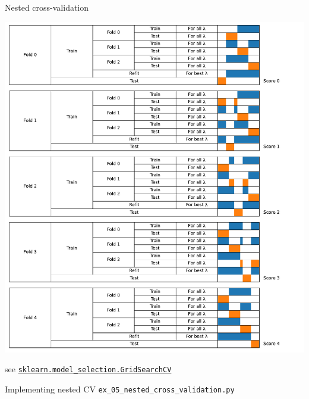 \documentclass[presentation,mathserif,table]{beamer}
\begin{document}
\begin{frame}[label={sec:org11d1bcf},fragile]{Nested cross-validation}
 \begin{center}
\includegraphics[width=.9\linewidth]{cv_figure_nested.pdf}
\end{center}
see  \href{https://scikit-learn.org/stable/modules/generated/sklearn.model\_selection.GridSearchCV.html}{\texttt{sklearn.model\_selection.GridSearchCV}}
\end{frame}
\begin{frame}[label={sec:org49a2837},fragile]{Implementing nested CV}
 \texttt{ex\_05\_nested\_cross\_validation.py}
\end{frame}
\end{document}
